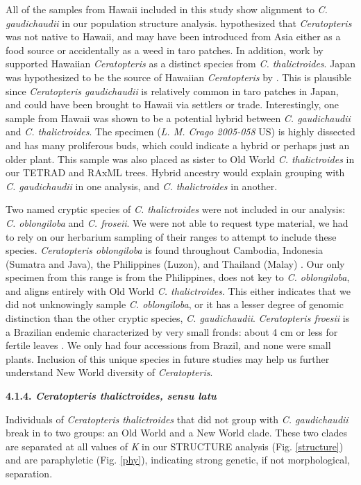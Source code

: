 \documentclass[12pt]{article}
\begin{document}
\begin{flushleft}
All of the samples from Hawaii included in this study show alignment to \textit{C. gaudichaudii} in our population structure analysis. \textcite{Wagner1950} hypothesized that \textit{Ceratopteris} was not native to Hawaii, and may have been introduced from Asia either as a food source or accidentally as a weed in taro patches. In addition, work by \textcite{Hickok1979} supported Hawaiian \textit{Ceratopteris} as a distinct species from \textit{C. thalictroides}. Japan was hypothesized to be the source of Hawaiian \textit{Ceratopteris} by \textcite{Lloyd1973}. This is plausible since \textit{Ceratopteris gaudichaudii} is relatively common in taro patches in Japan, and could have been brought to Hawaii via settlers or trade. Interestingly, one sample from Hawaii was shown to be a potential hybrid between \textit{C. gaudichaudii} and \textit{C. thalictroides}. The specimen (\textit{L. M. Crago 2005-058} US) is highly dissected and has many proliferous buds, which could indicate a hybrid or perhaps just an older plant. This sample was also placed as sister to Old World \textit{C. thalictroides} in our TETRAD and RAxML trees. Hybrid ancestry would explain grouping with \textit{C. gaudichaudii} in one analysis, and \textit{C. thalictroides} in another.

Two named cryptic species of \textit{C. thalictroides} were not included in our analysis: \textit{C. oblongiloba} and \textit{C. froseii}. We were not able to request type material, we had to rely on our herbarium sampling of their ranges to attempt to include these species. \textit{Ceratopteris oblongiloba} is found throughout Cambodia, Indonesia (Sumatra and Java), the Philippines (Luzon), and Thailand (Malay) \autocite{Masuyama2010}. Our only specimen from this range is from the Philippines, does not key to \textit{C. oblongiloba}, and aligns entirely with Old World \textit{C. thalictroides}. This either indicates that we did not unknowingly sample \textit{C. oblongiloba}, or it has a lesser degree of genomic distinction than the other cryptic species, \textit{C. gaudichaudii}. \textit{Ceratopteris froesii} is a Brazilian endemic characterized by very small fronds: about 4 cm or less for fertile leaves \autocite{Masuyama2010}. We only had four accessions from Brazil, and none were small plants. Inclusion of this unique species in future studies may help us further understand New World diversity of \textit{Ceratopteris}.

\textbf{4.1.4. \textit{Ceratopteris thalictroides, sensu latu}}

Individuals of \textit{Ceratopteris thalictroides} that did not group with \textit{C. gaudichaudii} break in to two groups: an Old World and a New World clade. These two clades are separated at all values of \textit{K} in our {\small{STRUCTURE}} analysis (Fig. \ref{structure}) and are paraphyletic (Fig. \ref{phy}), indicating strong genetic, if not morphological, separation.


\end{flushleft}
\end{document}
